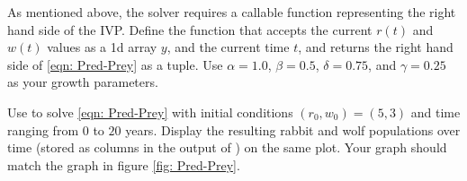 \begin{problem}
As mentioned above, the  solver requires a callable function representing the right hand side of the IVP. 
Define the function  that accepts the current $r(t)$ and $w(t)$ values as a 1d array $y$, and the current time $t$, 
and returns the right hand side of \eqref{eqn: Pred-Prey} as a tuple. 
Use $\alpha=1.0$, $\beta=0.5$, $\delta=0.75$, and $\gamma=0.25$ as your growth parameters.
%	

\end{problem}



\begin{problem}
Use  to solve \eqref{eqn: Pred-Prey} with initial conditions $(r_0, w_0) = (5, 3)$ and time ranging from $0$ to $20$ years.
Display the resulting rabbit and wolf populations over time (stored as columns in the output of ) on the same plot. Your graph should match the graph in figure \ref{fig: Pred-Prey}.
\end{problem}

